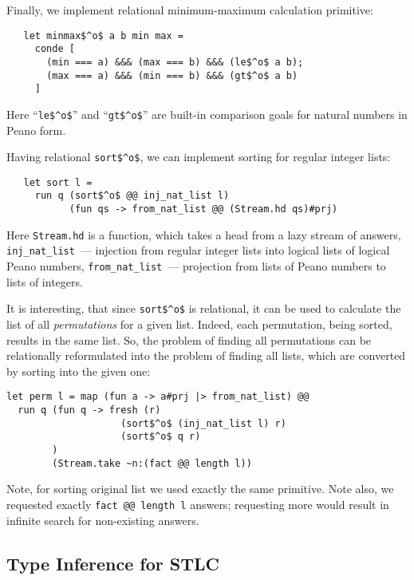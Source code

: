 Finally, we implement relational minimum-maximum calculation
primitive:

\begin{lstlisting}
   let minmax$^o$ a b min max = 
     conde [
       (min === a) &&& (max === b) &&& (le$^o$ a b);
       (max === a) &&& (min === b) &&& (gt$^o$ a b)
     ]
\end{lstlisting}

Here ``\lstinline{le$^o$}'' and ``\lstinline{gt$^o$}'' are built-in comparison goals for natural numbers in Peano form.

Having relational \lstinline{sort$^o$}, we can implement sorting for regular integer lists:

\begin{lstlisting}
   let sort l =
     run q (sort$^o$ @@ inj_nat_list l)
           (fun qs -> from_nat_list @@ (Stream.hd qs)#prj)
\end{lstlisting}

Here \lstinline{Stream.hd} is a function, which takes a head from a lazy stream of answers, 
\lstinline{inj_nat_list}~--- injection from regular integer lists into logical lists of logical Peano numbers, 
\lstinline{from_nat_list}~--- projection from lists of Peano numbers to lists of integers.

It is interesting, that since \lstinline{sort$^o$} is
relational, it can be used to calculate the list of all \emph{permutations}
for a given list. Indeed, each permutation, being sorted, results in the same list. 
So, the problem of finding all permutations can be relationally reformulated into 
the problem of finding all lists, which are converted by sorting into the given one:

\begin{lstlisting}
let perm l = map (fun a -> a#prj |> from_nat_list) @@
  run q (fun q -> fresh (r)
                    (sort$^o$ (inj_nat_list l) r) 
                    (sort$^o$ q r)
        )
        (Stream.take ~n:(fact @@ length l))
\end{lstlisting}

Note, for sorting original list we used exactly the same primitive. Note also, 
we requested exactly \lstinline{fact @@ length l} answers; requesting more
would result in infinite search for non-existing answers. 

\subsection{Type Inference for STLC}

